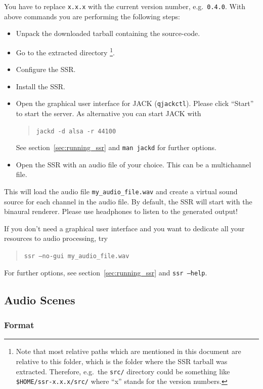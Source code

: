 You have to replace \texttt{x.x.x} with the current version number, e.g.\
\texttt{0.4.0}.
With above commands you are performing the following steps:
\begin{itemize}
  \item Unpack the downloaded tarball containing the source-code.
  \item Go to the extracted directory%
    \footnote{Note that most relative paths which are
    mentioned in this document are relative to this folder,
    which is the folder where the SSR tarball was extracted. Therefore,
    e.g.\ the \texttt{src/} directory could be something like
    \texttt{\$HOME/ssr-x.x.x/src/} where ``x'' stands for the 
    version numbers.}.
  \item Configure the SSR.
  \item Install the SSR.
  \item Open the graphical user interface for JACK (\verb+qjackctl+).
    Please click ``Start'' to start the server.
    As alternative you can start JACK with
    \begin{quote}
    \texttt{jackd -d alsa -r 44100}
    \end{quote}
    See section~\ref{sec:running_ssr} and
    \texttt{man jackd} for further options.
  \item Open the SSR with an audio file of your choice. This can be a
    multichannel file.
\end{itemize}
%
This will load the audio file \texttt{my\_audio\_file.wav} and create a virtual
sound source for each channel in the audio file.
By default, the SSR will start with the binaural renderer. Please use headphones
to listen to the generated output!

If you don't need a graphical user interface and you want to dedicate all your
resources to audio processing, try
\begin{quote}
\texttt{ssr --no-gui my\_audio\_file.wav}
\end{quote}
%
For further options, see section~\ref{sec:running_ssr} and \texttt{ssr --help}.

\subsection{Audio Scenes}
\label{sec:audio_scenes}

\subsubsection{Format}

